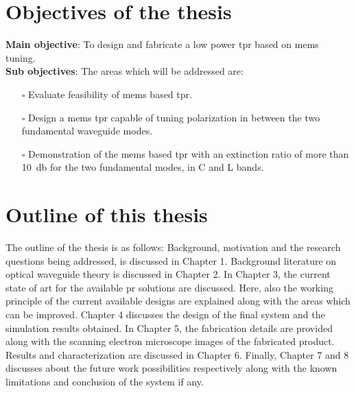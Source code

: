 \documentclass[../report.tex]{subfiles}
\begin{document}
	\section{Objectives of the thesis}
\textbf{Main objective}: To design and fabricate a low power \gls{tpr} based on \gls{mems} tuning. \\

\noindent \textbf{Sub objectives}: The areas which will be addressed are:
\begin{itemize}	
	\item[$\square$] Evaluate feasibility of \gls{mems} based \gls{tpr}. 
	\item[$\square$] Design a \gls{mems} \gls{tpr} capable of tuning polarization in between the two fundamental waveguide modes.
	\item[$\square$] Demonstration of the \gls{mems} based \gls{tpr} with an extinction ratio of more than  \SI{10}{\decibel} for the two fundamental modes, in C and L bands.
\end{itemize}
	
	\section{Outline of this thesis}
The outline of the thesis is as follows: Background, motivation and the research questions being addressed, is discussed in Chapter 1. Background literature on optical waveguide theory is discussed in Chapter 2. In Chapter 3, the current state of art for the available \gls{pr} solutions are discussed. Here, also the working principle of the current available designs are explained along with the areas which can be improved. Chapter 4 discusses the design of the final system and the simulation results obtained. In Chapter 5, the fabrication details are provided along with the scanning electron microscope images of the fabricated product. Results and characterization are discussed in Chapter 6. Finally, Chapter 7 and 8 discusses about the future work possibilities respectively along with the known limitations and conclusion of the system if any.  
	
\end{document}
